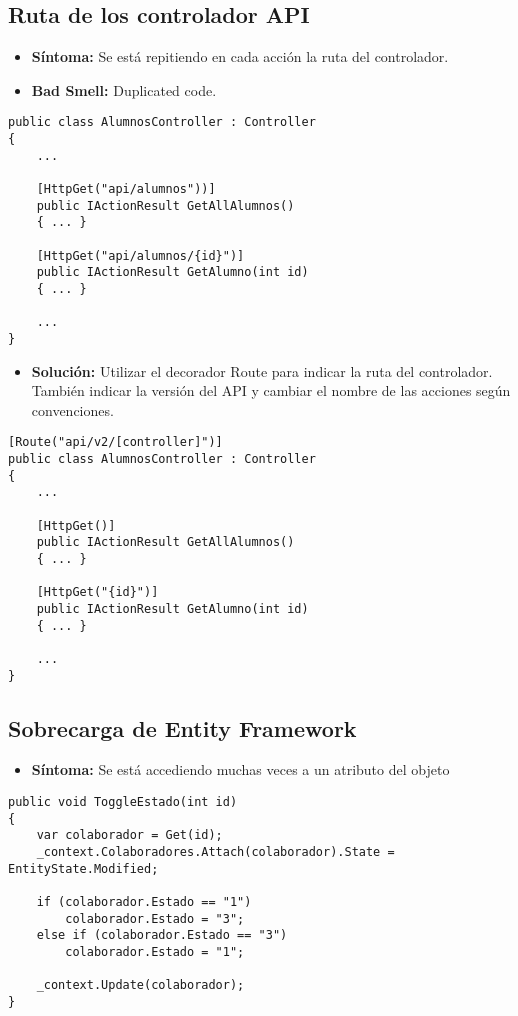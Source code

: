 \subsection{Ruta de los controlador API}
\begin{itemize}
	\item \textbf{Síntoma:} Se está repitiendo en cada acción la ruta del controlador.
	\item \textbf{Bad Smell:} Duplicated code.
\end{itemize}

\begin{lstlisting}[language={[Sharp]C}]
public class AlumnosController : Controller
{
	...	
	
	[HttpGet("api/alumnos"))]
	public IActionResult GetAllAlumnos()
	{ ... }
	
	[HttpGet("api/alumnos/{id}")]
	public IActionResult GetAlumno(int id)
	{ ... }
	
	...
}
\end{lstlisting}

\begin{itemize}	
	\item \textbf{Solución:} Utilizar el decorador Route para indicar la ruta del controlador. También indicar la versión del API y cambiar el nombre de las acciones según convenciones.
\end{itemize}

\begin{lstlisting}[language={[Sharp]C}]
[Route("api/v2/[controller]")]
public class AlumnosController : Controller
{
	...	
	
	[HttpGet()]
	public IActionResult GetAllAlumnos()
	{ ... }
	
	[HttpGet("{id}")]
	public IActionResult GetAlumno(int id)
	{ ... }
	
	...
}
\end{lstlisting}


\subsection{Sobrecarga de Entity Framework}
\begin{itemize}
	\item \textbf{Síntoma:} Se está accediendo muchas veces a un atributo del objeto
\end{itemize}

\begin{lstlisting}[language={[Sharp]C}]
public void ToggleEstado(int id)
{
	var colaborador = Get(id);
	_context.Colaboradores.Attach(colaborador).State = EntityState.Modified;
	
	if (colaborador.Estado == "1")
		colaborador.Estado = "3";
	else if (colaborador.Estado == "3")
		colaborador.Estado = "1";
	
	_context.Update(colaborador);
}
\end{lstlisting}

